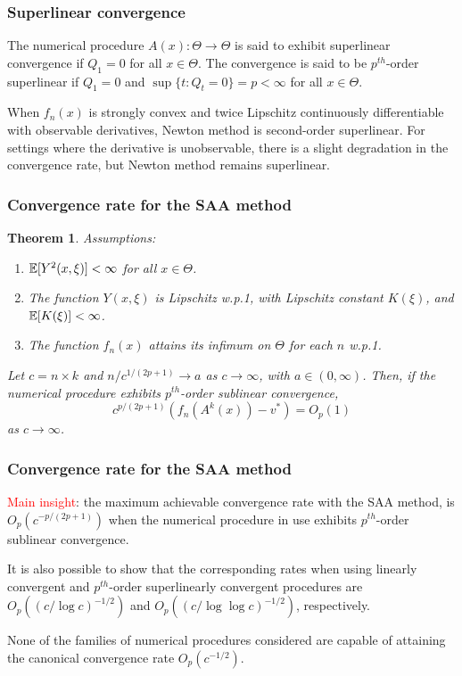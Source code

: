 \documentclass[usepdftitle=false, aspectratio=169]{beamer}
\newtheorem{theo}{Theorem}
\begin{document}
\begin{frame}
\frametitle{Superlinear convergence}

\begin{definition}
The numerical procedure $A(x) : \Theta \rightarrow \Theta$ is said to exhibit superlinear convergence if $Q_1 = 0$ for all $x \in \Theta$.
The convergence is said to be $p^{th}$-order superlinear if $Q_1 = 0$ and $\sup \{ t : Q_t = 0 \} = p < \infty$ for all $x \in \Theta$.
\end{definition}

\mbox{}

When $f_n(x)$ is strongly convex and twice Lipschitz continuously differentiable with observable derivatives, Newton method is second-order superlinear.
For settings where the derivative is unobservable, there is a slight degradation in the convergence rate, but Newton method remains superlinear.

\end{frame}

\begin{frame}
\frametitle{Convergence rate for the SAA method}

\begin{theo}
Assumptions:
\begin{enumerate}
\item
${\mathbb{E}}[ Y^2 ( x , \xi)] < \infty$ for all $x \in \Theta$.
\item
The function $Y(x, \xi)$ is Lipschitz w.p.1, with Lipschitz constant $K(\xi)$, and ${\mathbb{E}}[K(\xi)] < \infty$.
\item
The function $f_n(x)$ attains its infimum on $\Theta$ for each $n$ w.p.1.
\end{enumerate}
Let $c = n \times k$ and $n/c^{1 /( 2p + 1 )} \rightarrow a$ as $c \rightarrow \infty$, with $a \in (0, \infty)$.
Then, if the numerical procedure exhibits $p^{th}$-order sublinear convergence,
$$
c^{p /( 2p + 1 )} \left( f_n ( A^k ( x )) - v^* \right) = O_p(1)
$$
as $c \rightarrow \infty$.
\end{theo}

\end{frame}

\begin{frame}
\frametitle{Convergence rate for the SAA method}

\textcolor{red}{Main insight}: the maximum achievable convergence rate with the SAA method, is $O_p ( c^{- p /( 2p + 1 )})$ when the numerical
procedure in use exhibits $p^{th}$-order sublinear convergence.

\mbox{}

It is also possible to show that the corresponding rates when using linearly convergent and $p^{th}$-order superlinearly convergent procedures are $O_p (( c / \log c )^{-1/2} )$ and $O_p (( c / \log\log c )^{-1/2} )$, respectively.

\mbox{}

None of the families of numerical procedures considered are capable
of attaining the canonical convergence rate $O_p ( c^{-1/2} )$.

\end{frame}
\end{document}
